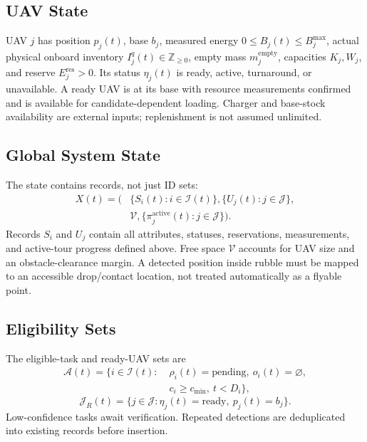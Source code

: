 \documentclass[conference]{IEEEtran}
\begin{document}
\subsection{UAV State}
UAV $j$ has position $p_j(t)$, base $b_j$, measured energy $0\leq B_j(t)\leq B_j^{\max}$, actual physical onboard inventory $I_j^q(t)\in\mathbb Z_{\geq0}$, empty mass $m_j^{\mathrm{empty}}$, capacities $K_j,W_j$, and reserve $E_j^{\mathrm{res}}>0$. Its status $\eta_j(t)$ is ready, active, turnaround, or unavailable. A ready UAV is at its base with resource measurements confirmed and is available for candidate-dependent loading. Charger and base-stock availability are external inputs; replenishment is not assumed unlimited.

\subsection{Global System State}
The state contains records, not just ID sets:
\begin{equation}
\begin{split}
X(t)=\big(&\{S_i(t):i\in\mathcal I(t)\},\{U_j(t):j\in\mathcal J\},\\
         &\mathcal V,\{\pi_j^{\mathrm{active}}(t):j\in\mathcal J\}\big).
\end{split}
\end{equation}
Records $S_i$ and $U_j$ contain all attributes, statuses, reservations, measurements, and active-tour progress defined above. Free space $\mathcal V$ accounts for UAV size and an obstacle-clearance margin. A detected position inside rubble must be mapped to an accessible drop/contact location, not treated automatically as a flyable point.

\subsection{Eligibility Sets}
The eligible-task and ready-UAV sets are
\begin{equation}
\begin{split}
\mathcal A(t)=\{i\in\mathcal I(t):\;&\rho_i(t)=\mathrm{pending},\ o_i(t)=\varnothing,\\
                               &c_i\geq c_{\min},\ t<D_i\},
\end{split}\label{eq:eligible}
\end{equation}
\begin{equation}
\mathcal J_R(t)=\{j\in\mathcal J:\eta_j(t)=\mathrm{ready},\ p_j(t)=b_j\}.
\end{equation}
Low-confidence tasks await verification. Repeated detections are deduplicated into existing records before insertion.
\end{document}
